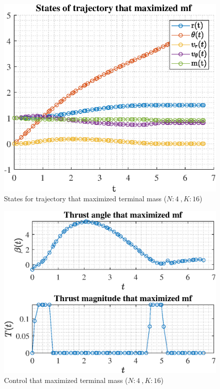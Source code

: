 \documentclass[]{article}
\begin{document}
	\begin{figure}
		\centering
		\includegraphics[scale=0.75]{states_N4_K16_C3_mf.eps}
		\caption{States for trajectory that maximized terminal mass (\(N:4\ , K:16\))}
		\label{fig:states_N4_K16_C3_mf}
	\end{figure}
	\begin{figure}
		\centering
		\includegraphics[scale=0.75]{control_N4_K16_C3_mf.eps}
		\caption{Control that maximized terminal mass (\(N:4\ , K:16\))}
		\label{fig:control_N4_K16_C3_mf}
	\end{figure}
\end{document}
